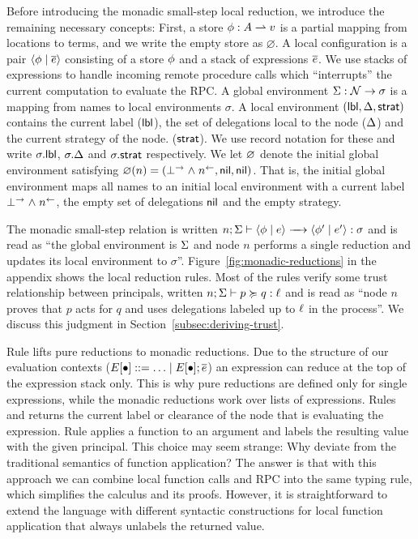 Before introducing the monadic small-step local reduction, we introduce the remaining necessary concepts: First, a store $\phi: A \rightharpoonup v$ is a partial mapping from locations to terms, and we write the empty store as $\varnothing$. A local configuration is a pair $\langle \phi \mid \overline{e} \rangle$ consisting of a store $\phi$ and a stack of expressions $\overline{e}$. We use stacks of expressions to handle incoming remote procedure calls which ``interrupts'' the current computation to evaluate the RPC. A global environment $\Sigma: \mathcal{N} \to \sigma$ is a mapping from names to local environments $\sigma$. A local environment $(\mathsf{lbl}, \Delta, \mathsf{strat})$ contains the current label ($\mathsf{lbl}$), the set of delegations local to the node ($\Delta$) and the current strategy of the node. ($\mathsf{strat}$). We use record notation for these and write $\sigma.\mathsf{lbl}$, $\sigma.\Delta$ and $\sigma.\mathsf{strat}$ respectively. We let $\varnothing$ denote the initial global environment satisfying $\varnothing(n) = (\bot^{\rightarrow} \mathrel{\land} n^{\leftarrow}, \mathsf{nil}, \mathsf{nil})$. That is, the initial global environment maps all names to an initial local environment with a current label $\bot^{\rightarrow} \mathrel{\land} n^{\leftarrow}$, the empty set of delegations $\mathsf{nil}$ and the empty strategy.

The monadic small-step relation is written $\step{n; \env}{\config{\store}{\expr}}{\config{\store'}{\expr'}}{\sigma}$ and is read as ``the global environment is $\Sigma$ and node $n$ performs a single reduction and updates its local environment to $\sigma$''. Figure~\ref{fig:monadic-reductions} in the appendix shows the local reduction rules. Most of the rules verify some trust relationship between principals, written $n; \Sigma \vdash p \succcurlyeq q : \ell$ and is read as ``node $n$ proves that $p$ acts for $q$ and uses delegations labeled up to $\ell$ in the process''. We discuss this judgment in Section~\ref{subsec:deriving-trust}.

Rule  lifts pure reductions to monadic reductions. Due to the structure of our evaluation contexts ($E \lbrack \bullet \rbrack ::= \ldots \mid E \lbrack \bullet \rbrack ; \overline{e}$) an expression can reduce at the top of the expression stack only. This is why pure reductions are defined only for single expressions, while the monadic reductions work over lists of expressions. Rules  and  returns the current label or clearance of the node that is evaluating the expression. Rule  applies a function to an argument and labels the resulting value with the given principal. This choice may seem strange: Why deviate from the traditional semantics of function application? The answer is that with this approach we can combine local function calls and RPC into the same typing rule, which simplifies the calculus and its proofs. However, it is straightforward to extend the language with different syntactic constructions for local function application that always unlabels the returned value.

